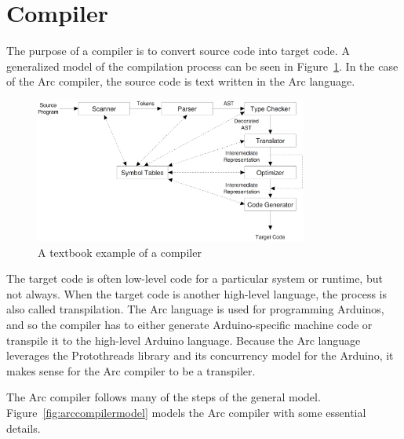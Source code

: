 \section{Compiler}\label{sec:compiler}
The purpose of a compiler is to convert source code into target code. A generalized model of the compilation process can be seen in Figure~\ref{fig:generalcompilermodel}. In the case of the Arc compiler, the source code is text written in the Arc language.


\begin{figure}[htb!]
    \centering
    \includegraphics[width=0.8\textwidth]{figures/Full_Compiler.png}
    \caption{A textbook example of a compiler~\cite{CraftingCompiler}}
    \label{fig:generalcompilermodel}
\end{figure}


The target code is often low-level code for a particular system or runtime, but not always. When the target code is another high-level language, the process is also called transpilation. The Arc language is used for programming Arduinos, and so the compiler has to either generate Arduino-specific machine code or transpile it to the high-level Arduino language. Because the Arc language leverages the Protothreads library and its concurrency model for the Arduino, it makes sense for the Arc compiler to be a transpiler.

The Arc compiler follows many of the steps of the general model. Figure~\ref{fig:arccompilermodel} models the Arc compiler with some essential details.



